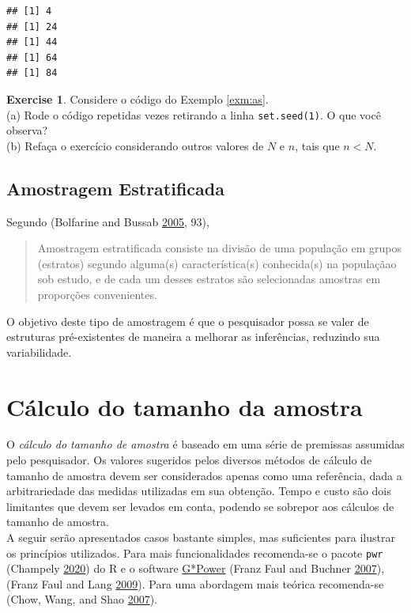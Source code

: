 \documentclass[
]{book}
\theoremstyle{definition}
\theoremstyle{definition}
\theoremstyle{definition}
\newtheorem{exercise}{Exercise}[chapter]
\theoremstyle{remark}
\begin{document}
\begin{verbatim}
## [1] 4
## [1] 24
## [1] 44
## [1] 64
## [1] 84
\end{verbatim}

\begin{exercise}
\protect\hypertarget{exr:unnamed-chunk-77}{}{\label{exr:unnamed-chunk-77} }Considere o código do Exemplo \ref{exm:as}.\\
(a) Rode o código repetidas vezes retirando a linha \texttt{set.seed(1)}. O que você observa?\\
(b) Refaça o exercício considerando outros valores de \(N\) e \(n\), tais que \(n<N\).
\end{exercise}

\hypertarget{amostragem-estratificada}{%
\subsection{Amostragem Estratificada}\label{amostragem-estratificada}}

Segundo (Bolfarine and Bussab \protect\hyperlink{ref-bolfarine2005elementos}{2005}, 93),

\begin{quote}
Amostragem estratificada consiste na divisão de uma população em grupos (estratos) segundo alguma(s) característica(s) conhecida(s) na populaçãao sob estudo, e de cada um desses estratos são selecionadas amostras em proporções convenientes.
\end{quote}

O objetivo deste tipo de amostragem é que o pesquisador possa se valer de estruturas pré-existentes de maneira a melhorar as inferências, reduzindo sua variabilidade.

\hypertarget{cuxe1lculo-do-tamanho-da-amostra}{%
\section{Cálculo do tamanho da amostra}\label{cuxe1lculo-do-tamanho-da-amostra}}

O \emph{cálculo do tamanho de amostra} é baseado em uma série de premissas assumidas pelo pesquisador. Os valores sugeridos pelos diversos métodos de cálculo de tamanho de amostra devem ser considerados apenas como uma referência, dada a arbitrariedade das medidas utilizadas em sua obtenção. Tempo e custo são dois limitantes que devem ser levados em conta, podendo se sobrepor aos cálculos de tamanho de amostra.\\
A seguir serão apresentados casos bastante simples, mas suficientes para ilustrar os princípios utilizados. Para mais funcionalidades recomenda-se o pacote \texttt{pwr} (Champely \protect\hyperlink{ref-champely2020pwr}{2020}) do R e o software \href{https://www.gpower.hhu.de}{G*Power} (Franz Faul and Buchner \protect\hyperlink{ref-faul2007gpower}{2007}), (Franz Faul and Lang \protect\hyperlink{ref-faul2009gpower}{2009}). Para uma abordagem mais teórica recomenda-se (Chow, Wang, and Shao \protect\hyperlink{ref-chow2007sample}{2007}).
\end{document}
